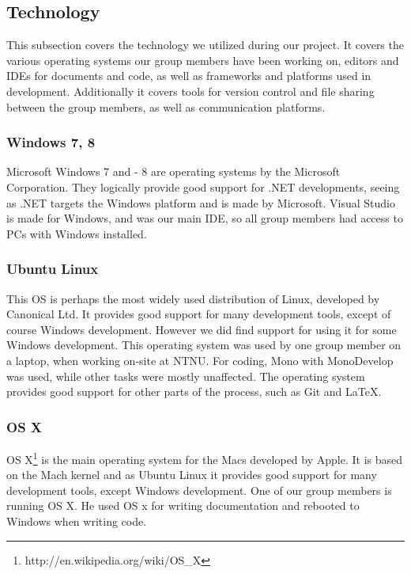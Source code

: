 \subsection{Technology}%

This subsection covers the technology we utilized during our project. It covers the various operating systems our group members have been working on, editors and IDEs for documents and code, as well as frameworks and platforms used in development. Additionally it covers tools for version control and file sharing between the group members, as well as communication platforms.

\subsubsection{Windows 7, 8}
Microsoft Windows 7 and - 8 are operating systems by the Microsoft Corporation. They logically provide good support for .NET developments, seeing as .NET targets the Windows platform and is made by Microsoft. Visual Studio is made for Windows, and was our main IDE, so all group members had access to PCs with Windows installed.

\subsubsection{Ubuntu Linux}
This OS is perhaps the most widely used distribution of Linux, developed by Canonical Ltd. It provides good support for many development tools, except of course Windows development. However we did find support for using it for some Windows development.
This operating system was used by one group member on a laptop, when working on-site at NTNU. For coding, Mono with MonoDevelop was used, while other tasks were mostly unaffected. The operating system provides good support for other parts of the process, such as Git and \LaTeX.

\subsubsection{OS X}
OS X\footnote{http://en.wikipedia.org/wiki/OS\_X}
 is the main operating system for the Macs developed by Apple. It is based on the Mach kernel and as Ubuntu Linux it provides good support for many development tools, except Windows development. One of our group members is running OS X. He used OS x for writing documentation and rebooted to Windows when writing code. 

